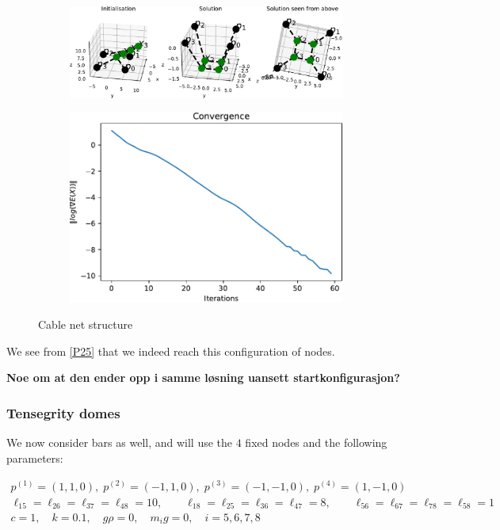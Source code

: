 \begin{figure}
\centering
\begin{subfigure}{.4\textwidth}
  \centering
  \includegraphics[width=0.4\linewidth]{Bilder/p25.pdf}
\end{subfigure}%
\begin{subfigure}{.4\textwidth}
  \centering
  \includegraphics[width=0.3\linewidth]{Bilder/P25conv.pdf}
  \label{fig:sub2}
\end{subfigure}
\caption{Cable net structure}
\label{P25}
\end{figure}

We see from \eqref{P25} that we indeed reach this configuration of nodes. 

\textbf{Noe om at den ender opp i samme løsning uansett startkonfigurasjon?}

\subsubsection{Tensegrity domes}
We now consider bars as well, and will use the $4$ fixed nodes and the following parameters:

\begin{equation*}
    \begin{gathered}
    p^{(1)} = (1,1,0),\; p^{(2)} = (-1,1,0),\; p^{(3)} = (-1,-1,0),\; p^{(4)} = (1,-1,0)\\
    \ell_{15} = \ell_{26} = \ell_{37} = \ell_{48} = 10, \qquad \ell_{18} = \ell_{25} = \ell_{36} = \ell_{47} = 8, \qquad \ell_{56} = \ell_{67} = \ell_{78} = \ell_{58} = 1\\
    c=1, \quad k= 0.1, \quad g \rho = 0,\quad m_i g = 0, \quad i = 5,6,7,8
    \end{gathered}
\end{equation*}

